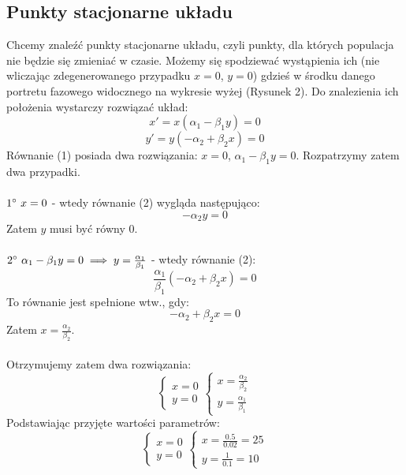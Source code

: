 \documentclass{article}
\begin{document}
\subsection{Punkty stacjonarne układu}
Chcemy znaleźć punkty stacjonarne układu, czyli punkty, dla których populacja nie będzie się zmieniać w czasie. Możemy się spodziewać wystąpienia ich (nie wliczając zdegenerowanego przypadku $x=0$, $y=0$) gdzieś w środku danego portretu fazowego widocznego na wykresie wyżej (Rysunek 2). Do znalezienia ich położenia wystarczy rozwiązać układ:
\begin{equation}
    x' = x(\alpha_1 - \beta_1y) = 0
\end{equation}
\begin{equation}
    y' = y(-\alpha_2 + \beta_2x) = 0
\end{equation}
Równanie (1) posiada dwa rozwiązania: $x=0$, $\alpha_1-\beta_1y=0$. Rozpatrzymy zatem dwa przypadki.
\\\\
$1\degree\ x = 0$ - wtedy równanie (2) wygląda następująco:
$$-\alpha_2y = 0$$
Zatem $y$ musi być równy $0$.
\\\\
$2\degree\ \alpha_1-\beta_1y=0 \implies y = \frac{\alpha_1}{\beta_1}$ - wtedy równanie (2):
$$\frac{\alpha_1}{\beta_1}(-\alpha_2 + \beta_2x) = 0$$
To równanie jest spełnione wtw., gdy:
$$-\alpha_2 + \beta_2x = 0$$
Zatem $x = \frac{\alpha_2}{\beta_2}$.
\\\\
Otrzymujemy zatem dwa rozwiązania:
\begin{equation}
    \begin{cases}
        x = 0 \\
        y = 0
    \end{cases} \nonumber
    \begin{cases}
        x = \frac{\alpha_2}{\beta_2} \\
        y = \frac{\alpha_1}{\beta_1}
    \end{cases} \nonumber
\end{equation}
Podstawiając przyjęte wartości parametrów:
\begin{equation}
    \begin{cases}
        x = 0 \\
        y = 0
    \end{cases} \nonumber
    \begin{cases}
        x = \frac{0.5}{0.02} = 25 \\
        y = \frac{1}{0.1} = 10
    \end{cases} \nonumber
\end{equation}
\end{document}
